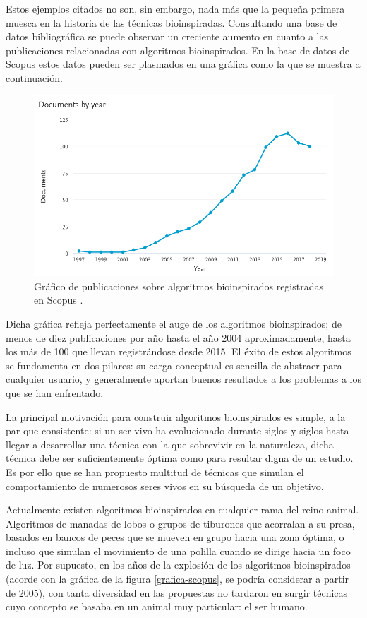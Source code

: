 Estos ejemplos citados no son, sin embargo, nada más que la pequeña primera muesca en la historia de las técnicas bioinspiradas. Consultando una base de datos bibliográfica se puede observar un creciente aumento en cuanto a las publicaciones relacionadas con algoritmos bioinspirados. En la base de datos de Scopus estos datos pueden ser plasmados en una gráfica como la que se muestra a continuación.

\begin{figure}[h]
	\centering
	\includegraphics[scale=0.4]{imagenes/scopus-grafico-bioinspirados.png}
	\caption{Gráfico de publicaciones sobre algoritmos bioinspirados registradas en Scopus \cite{scopus-website}.}
	\label{scopus-bioinspirados}
\end{figure}

Dicha gráfica refleja perfectamente el auge de los algoritmos bioinspirados; de menos de diez publicaciones por año hasta el año 2004 aproximadamente, hasta los más de 100 que llevan registrándose desde 2015. El éxito de estos algoritmos se fundamenta en dos pilares: su carga conceptual es sencilla de abstraer para cualquier usuario, y generalmente aportan buenos resultados a los problemas a los que se han enfrentado.

La principal motivación para construir algoritmos bioinspirados es simple, a la par que consistente: si un ser vivo ha evolucionado durante siglos y siglos hasta llegar a desarrollar una técnica con la que sobrevivir en la naturaleza, dicha técnica debe ser suficientemente óptima como para resultar digna de un estudio. Es por ello que se han propuesto multitud de técnicas que simulan el comportamiento de numerosos seres vivos en su búsqueda de un objetivo.

Actualmente existen algoritmos bioinspirados en cualquier rama del reino animal. Algoritmos de manadas de lobos o grupos de tiburones que acorralan a su presa, basados en bancos de peces que se mueven en grupo hacia una zona óptima, o incluso que simulan el movimiento de una polilla cuando se dirige hacia un foco de luz. Por supuesto, en los años de la explosión de los algoritmos bioinspirados (acorde con la gráfica de la figura \ref{grafica-scopus}, se podría considerar a partir de 2005), con tanta diversidad en las propuestas no tardaron en surgir técnicas cuyo concepto se basaba en un animal muy particular: el ser humano.

